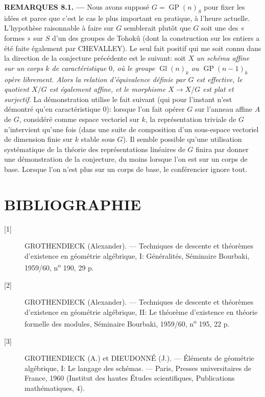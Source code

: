 \medskip
\noindent\textbf{REMARQUES 8.1. ---} Nous avons supposé
$G=\operatorname{GP}(n)_S$ pour fixer les idées et parce que c'est le cas le
plus important en pratique, à l'heure actuelle. L'hypothèse raisonnable à
faire sur $G$ semblerait plutôt que $G$ soit une des « formes » sur $S$ d'un
des groupes de Tohokû (dont la construction sur les entiers a été faite
également par CHEVALLEY). Le seul fait positif qui me soit connu dans la
direction de la conjecture précédente est le suivant: soit $X$ \emph{un schéma
affine sur un corps $k$ de caractéristique $0$, où le groupe
$\operatorname{Gl}(n)_k$ ou $\operatorname{GP}(n-1)_k$ opère librement. Alors
la relation d'équivalence définie par $G$ est effective, le quotient $X/G$ est
également affine, et le morphisme $X\to X/G$ est plat et surjectif}. La
démonstration utilise le fait suivant (qui pour l'instant n'est démontré qu'en
caractéristique $0$): lorsque l'on fait opérer $G$ sur l'anneau affine $A$ de
$G$, considéré comme espace vectoriel sur $k$, la représentation triviale de
$G$ n'intervient qu'une fois (dans une suite de composition d'un sous-espace
vectoriel de dimension finie sur $k$ stable sous $G$). Il semble possible
qu'une utilisation systématique de la
théorie des représentations linéaires de $G$ finira par donner une
démonstration de la conjecture, du moins lorsque l'on est sur un corps de base.
Lorsque l'on n'est plus sur un corps de base, le conférencier ignore tout.

\section*{BIBLIOGRAPHIE}

\begin{description}
\item[{[1]}] GROTHENDIECK (Alexander). --- Techniques de descente et théorèmes
d'existence en géométrie algébrique, I: Généralités, Séminaire Bourbaki,
1959/60, n\textsuperscript{o} 190, 29 p.

\item[{[2]}] GROTHENDIECK (Alexander). --- Techniques de descente et théorèmes
d'existence en géométrie algébrique, II: Le théorème d'existence en théorie
formelle des modules, Séminaire Bourbaki, 1959/60,
n\textsuperscript{o} 195, 22 p.

\item[{[3]}] GROTHENDIECK (A.) et DIEUDONNÉ (J.). --- Éléments de géométrie
algébrique, I: Le langage des schémas. --- Paris, Presses universitaires de
France, 1960 (Institut des hautes Études scientifiques, Publications
mathématiques, 4).
\end{description}

\par\smallskip
\begingroup\footnotesize
\endgroup
